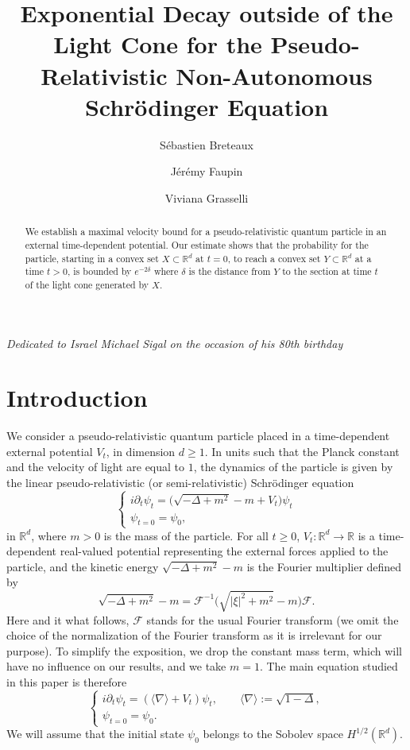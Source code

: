 \documentclass[12pt]{article}
\title{Exponential Decay outside of the Light Cone for the Pseudo-Relativistic Non-Autonomous Schrödinger Equation}
\date{}
\author{S\'ebastien Breteaux}
\author{J\'er\'emy Faupin}
\author{Viviana Grasselli}
\affil{Université de Lorraine, CNRS, IECL, F-57000 Metz, France}
\newcommand{\jnabla}{{\langle\nabla\rangle}}
\theoremstyle{plain}
\begin{document}
\maketitle


\begin{center}
\textit{Dedicated to Israel Michael Sigal on the occasion of his 80th birthday}
\end{center}






\begin{abstract}
    We establish a maximal velocity bound for a pseudo-relativistic quantum particle in an external time-dependent potential. Our estimate shows that the probability for the particle, starting in a convex set $X\subset\mathbb{R}^d$ at $t=0$, to reach a convex set $Y\subset\mathbb{R}^d$ at a time $t>0$, is bounded by $e^{-2\delta}$ where $\delta$ is the distance from $Y$ to the section at time $t$ of the light cone generated by $X$.
\end{abstract}

\section{Introduction}
We consider a pseudo-relativistic quantum particle placed in a time-dependent external potential $V_t$, in dimension $d\ge1$. In units such that the Planck constant and the velocity of light are equal to $1$, the dynamics of the particle is given by the linear pseudo-relativistic (or semi-relativistic) Schrödinger equation
\begin{equation*}
\begin{cases}
    i\partial_t\psi_t=\big(\sqrt{-\Delta+m^2}-m+V_t\big)\psi_t\\
    \psi_{t=0}=\psi_0,
\end{cases}
\end{equation*}
in $\mathbb{R}^d$, where $m>0$ is the mass of the particle. For all $t\ge0$, $V_t:\mathbb{R}^d\to\mathbb{R}$ is a time-dependent real-valued potential representing the external forces applied to the particle, and the kinetic energy $\sqrt{-\Delta+m^2}-m$ is the Fourier multiplier defined by
\begin{equation*}
    \sqrt{-\Delta+m^2}-m=\mathcal{F}^{-1}\big(\sqrt{|\xi|^2+m^2}-m\big)\mathcal{F}.
\end{equation*}
Here and it what follows, $\mathcal{F}$ stands for the usual Fourier transform (we omit the choice of the normalization of the Fourier transform as it is irrelevant for our purpose). To simplify the exposition, we drop the constant mass term, which will have no influence on our results, and we take $m=1$. The main equation studied in this paper is therefore
\begin{equation}\label{Cauchy-pb-propagateur-Schroedinger}
\begin{cases}
    i\partial_t\psi_t=(\langle\nabla\rangle+V_t)\psi_t, \qquad \jnabla := \sqrt{1-\Delta}, \\
    \psi_{t=0}=\psi_0.
\end{cases}
\end{equation}
We will assume that the initial state $\psi_0$ belongs to the Sobolev space $H^{1/2}(\mathbb{R}^d)$.
\end{document}

